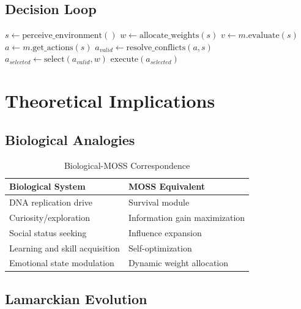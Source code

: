 \documentclass[10pt,a4paper]{article}
\begin{document}
\subsection{Decision Loop}

\begin{algorithm}
\caption{MOSS Decision Loop}
\begin{algorithmic}[1]
    \STATE $s \leftarrow \text{perceive\_environment}()$
    \STATE $w \leftarrow \text{allocate\_weights}(s)$
        \STATE $v \leftarrow m.\text{evaluate}(s)$
        \STATE $a \leftarrow m.\text{get\_actions}(s)$
    \ENDFOR
    \STATE $a_{valid} \leftarrow \text{resolve\_conflicts}(a, s)$
    \STATE $a_{selected} \leftarrow \text{select}(a_{valid}, w)$
    \STATE $\text{execute}(a_{selected})$
\ENDWHILE
\end{algorithmic}
\end{algorithm}

\section{Theoretical Implications}

\subsection{Biological Analogies}

\begin{table}[h]
\centering
\caption{Biological-MOSS Correspondence}
\begin{tabular}{@{}ll@{}}
\toprule
\textbf{Biological System} & \textbf{MOSS Equivalent} \\
\midrule
DNA replication drive & Survival module \\
Curiosity/exploration & Information gain maximization \\
Social status seeking & Influence expansion \\
Learning and skill acquisition & Self-optimization \\
Emotional state modulation & Dynamic weight allocation \\
\bottomrule
\end{tabular}
\end{table}

\subsection{Lamarckian Evolution}
\end{document}
